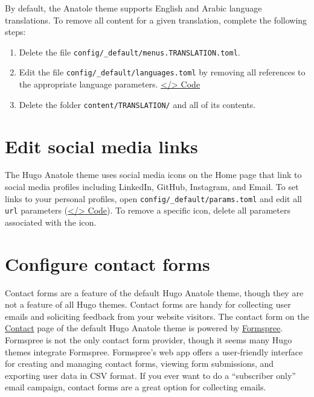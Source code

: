\documentclass[
]{book}
\begin{document}
By default, the Anatole theme supports English and Arabic language translations. To remove all content for a given translation, complete the following steps:

\begin{enumerate}
\def\labelenumi{\arabic{enumi}.}
\item
  Delete the file \texttt{config/\_default/menus.TRANSLATION.toml}.
\item
  Edit the file \texttt{config/\_default/languages.toml} by removing all references to the appropriate language parameters. \href{https://github.com/dannymorris/r4sites-anatole-custom/blob/master/config/_default/languages.toml}{\textless/\textgreater{} Code}
\item
  Delete the folder \texttt{content/TRANSLATION/} and all of its contents.
\end{enumerate}

\hypertarget{edit-social-media-links}{%
\section{Edit social media links}\label{edit-social-media-links}}

The Hugo Anatole theme uses social media icons on the Home page that link to social media profiles including LinkedIn, GitHub, Instagram, and Email. To set links to your personal profiles, open \texttt{config/\_default/params.toml} and edit all \texttt{url} parameters (\href{https://github.com/dannymorris/r4sites-anatole-custom/blob/master/config/_default/params.toml\#L40-L60}{\textless/\textgreater{} Code}). To remove a specific icon, delete all parameters associated with the icon.

\hypertarget{configure-contact-forms}{%
\section{Configure contact forms}\label{configure-contact-forms}}

Contact forms are a feature of the default Hugo Anatole theme, though they are not a feature of all Hugo themes. Contact forms are handy for collecting user emails and soliciting feedback from your website visitors. The contact form on the \href{https://r4sites-anatole-custom.netlify.app/about/}{Contact} page of the default Hugo Anatole theme is powered by \href{https://formspree.io}{Formspree}. Formspree is not the only contact form provider, though it seems many Hugo themes integrate Formspree. Formspree's web app offers a user-friendly interface for creating and managing contact forms, viewing form submissions, and exporting user data in CSV format. If you ever want to do a ``subscriber only'' email campaign, contact forms are a great option for collecting emails.
\end{document}
